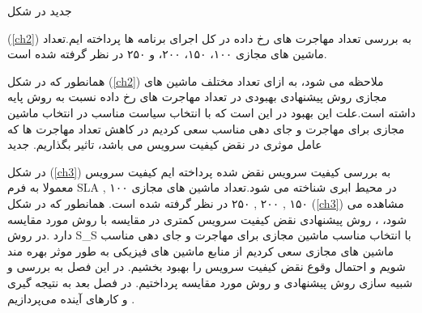 ‌جدید 
در شکل
	
(\ref{ch2})
به بررسی تعداد مهاجرت های رخ داده در کل اجرای برنامه ها  پرداخته ایم.تعداد ماشین های مجازی ۱۰۰، ۱۵۰، ۲۰۰، و ۲۵۰ در نظر گرفته شده است. 

همانطور که در شکل 
(\ref{ch2})
 ملاحظه می شود، به ازای تعداد مختلف ماشین های مجازی روش پیشنهادی بهبودی در تعداد مهاجرت های رخ داده نسبت به روش پایه داشته است.علت این بهبود در این است که با انتخاب سیاست مناسب در انتخاب ماشین مجازی برای مهاجرت و جای دهی مناسب سعی کردیم در کاهش تعداد مهاجرت ها که عامل موثری در نقض کیفیت سرویس می باشد، تاثیر بگذاریم.
‌جدید

 در شکل
(\ref{ch3})
 به بررسی کیفیت سرویس نقض شده پرداخته ایم کیفیت سرویس معمولا به فرم  SLA در محیط ابری شناخته می شود.تعداد ماشین های مجازی
۱۰۰
,
۱۵۰
,
۲۰۰
,
۲۵۰
  در نظر گرفته شده است.
همانطور که در شکل  
(\ref{ch3})
مشاهده می شود، ­، روش پیشنهادی نقض کیفیت سرویس کمتری در مقایسه با روش مورد مقایسه دارد .در روش S\_S با انتخاب مناسب ماشین مجازی برای مهاجرت و جای دهی مناسب ماشین های مجازی سعی کردیم از منابع ماشین های فیزیکی به طور موثر بهره مند شویم و احتمال وقوع نقض کیفیت سرویس  را بهبود بخشیم. 
در این فصل به بررسی و شبیه سازی روش پیشنهادی  و روش مورد مقایسه پرداختیم. در فصل بعد به نتیجه گیری  و کارهای آینده می‌پردازیم .